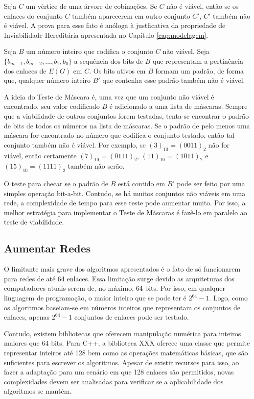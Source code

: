 Seja $C$ um vértice de uma árvore de cobinações. Se $C$ não é viável, então se os enlaces do conjunto $C$ também aparecerem em outro conjunto $C'$, $C'$ também não é viável. A prova para esse fato é anóloga à justficativa da propriedade de Inviabilidade Hereditária apresentada no Capítulo \ref{cap:modelagem}.

Seja $B$ um número inteiro que codifica o conjunto $C$ não viável. Seja $\{b_{m-1}, b_{m-2}, ..., b_1, b_0\}$ a sequência dos bits de $B$ que representam a pertinência dos enlaces de $E(G)$ em $C$. Os bits ativos em $B$ formam um padrão, de forma que, qualquer número inteiro $B'$ que contenha esse padrão também não é viável.

A ideia do Teste de Máscara é, uma vez que um conjunto não viável é encontrado, seu valor codificado $B$ é adicionado a uma lista de máscaras. Sempre que a viabilidade de outros conjuntos forem testadas, tenta-se encontrar o padrão de bits de todos os números na lista de máscaras. Se o padrão de pelo menos uma máscara for encontrado no número que codifica o conjunto testado, então tal conjunto também não é viável. Por exemplo, se $(3)_{10} = (0011)_2$ não for viável, então certamente $(7)_{10} = (0111)_2$, $(11)_{10} = (1011)_2$ e $(15)_{10} = (1111)_2$ também não serão.

O teste para checar se o padrão de $B$ está contido em $B'$ pode ser feito por uma simples operação bit-a-bit. Contudo, se há muitos conjuntos não viáveis em uma rede, a complexidade de tempo para esse teste pode aumentar muito. Por isso, a melhor estratégia para implementar o Teste de Máscaras é fazê-lo em paralelo ao teste de viabilidade.

\subsection{Aumentar Redes}

O limitante mais grave dos algoritmos apresentados é o fato de só funcionarem para redes de até 64 enlaces. Essa limitação surge devido as arquiteturas dos computadores atuais serem de, no máximo, 64 bits. Por isso, em qualquer linguagem de programação, o maior inteiro que se pode ter é $2^{64}-1$. Logo, como os algoritmos baseiam-se em números inteiros que representam os conjuntos de enlaces, apenas $2^{64}-1$ conjuntos de enlaces pode ser testado.

Contudo, existem bibliotecas que oferecem manipulação numérica para inteiros maiores que 64 bits. Para C++, a biblioteca XXX oferece uma classe que permite representar inteiros até 128 bem como as operações matemáticas básicas, que são suficientes para escrever os algoritmos. Apesar de existir recursos para isso, ao fazer a adaptação para um cenário em que 128 enlaces são permitidos, novas complexidades devem ser analisadas para verificar se a aplicabilidade dos algoritmos se mantém.
